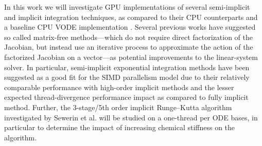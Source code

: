 \documentclass[preprint,12pt]{elsarticle}
\begin{document}
In this work we will investigate GPU implementations of several semi-implicit and implicit integration techniques, as compared to their CPU counterparts and a baseline CPU VODE implementation \cite{Hindmarsh:2005hg}.
Several previous works \cite{Stone:2013aa,Bisetti:2012jw,Niemeyer:2014aa,Perini20141180,McNenly2015581} have suggested so called matrix-free methods---which do not require direct factorization of the Jacobian, but instead use an iterative process to approximate the action of the factorized Jacobian on a vector---as potential improvements to the linear-system solver.
In particular, semi-implicit exponential integration methods have been suggested as a good fit for the SIMD parallelism model \cite{Stone:2013aa,Bisetti:2012jw,Niemeyer:2014aa} due to their relatively comparable performance with high-order implicit methods and the lesser expected thread-divergence performance impact as compared to fully implicit method.
Further, the 3-stage/5th order implicit Runge--Kutta algorithm \cite{hairer1996solving} investigated by Sewerin et al. \cite{Sewerin20151375} will be studied on a one-thread per ODE bases, in particular to determine the impact of increasing chemical stiffness on the algorithm.


\pagebreak



\end{document}
